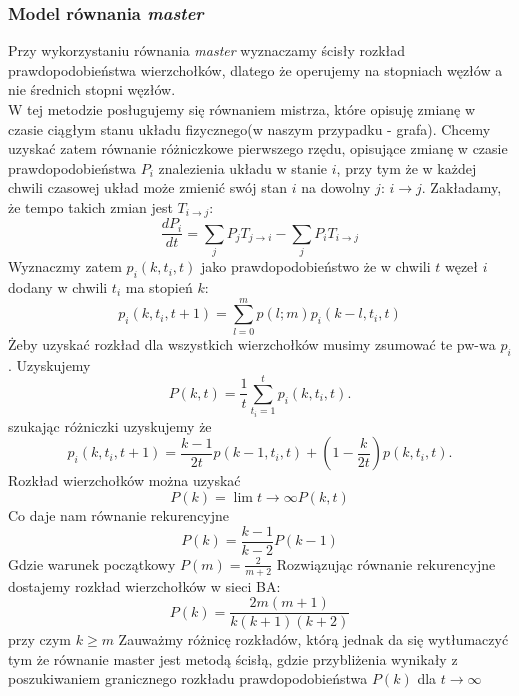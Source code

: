 \documentclass{article}
\begin{document}
\subsubsection{Model równania \textit{master}}
	Przy wykorzystaniu równania \textit{master} wyznaczamy ścisły rozkład prawdopodobieństwa wierzchołków, dlatego że operujemy na stopniach węzłów a nie średnich stopni węzłów.\\W tej metodzie posługujemy się równaniem mistrza, które opisuję zmianę w czasie ciągłym  stanu układu fizycznego(w naszym przypadku - grafa). Chcemy uzyskać zatem równanie różniczkowe pierwszego rzędu, opisujące zmianę w czasie prawdopodobieństwa $P_i$ znalezienia układu w stanie $i$, przy tym że w każdej chwili czasowej układ może zmienić swój stan $i$ na dowolny $j$: $ i \rightarrow j$. Zakładamy, że tempo takich zmian jest $T_{i \rightarrow j}$:
	\begin{equation}
	\frac{dP_i}{dt} = \sum_{j} P_jT_{j \rightarrow i} - \sum_{j} P_iT_{i \rightarrow j}
	\end{equation}
	Wyznaczmy zatem $p_i(k, t_i, t)$ jako prawdopodobieństwo że w chwili $t$ węzeł $i$ dodany w chwili $t_i$ ma stopień $k$:
	\begin{equation}\label{prw}
		p_i(k, t_i, t + 1) = \sum_{l=0}^m p(l;m)p_i(k - l, t_i, t)		
	\end{equation}
	Żeby uzyskać rozkład dla wszystkich wierzchołków musimy zsumować te pw-wa $p_i$. Uzyskujemy 
	\begin{equation}
		P(k, t) = \frac{1}{t} \sum_{t_i=1}^t p_i(k,t_i,t).
	\end{equation}
	szukając różniczki uzyskujemy że 
	\begin{equation}
		p_i(k, t_i, t + 1) = \frac{k - 1}{2t}p(k - 1, t_i, t) + (1 - \frac{k}{2t})p(k,t_i, t).
	\end{equation}
	Rozkład wierzchołków można uzyskać 
	\begin{equation}
		P(k) = \lim {t \to \infty} P(k, t)
	\end{equation}
	Co daje nam równanie rekurencyjne
	\begin{equation}
		P(k) = \frac{k - 1}{k - 2}P(k -1)
	\end{equation}
	Gdzie warunek początkowy $P(m) = \frac{2}{m + 2}$
	Rozwiązując równanie rekurencyjne dostajemy rozkład wierzchołków w sieci BA:
	\begin{equation}
		P(k) = \frac{2m(m + 1)}{k(k + 1)(k + 2)}
	\end{equation}
	przy czym $k \geq m$
Zauważmy różnicę rozkładów, którą jednak da się wytłumaczyć tym że równanie master jest metodą ścisłą, gdzie przybliżenia wynikały z poszukiwaniem granicznego rozkładu prawdopodobieństwa $P(k)$ dla $t \rightarrow \infty$
\end{document}
